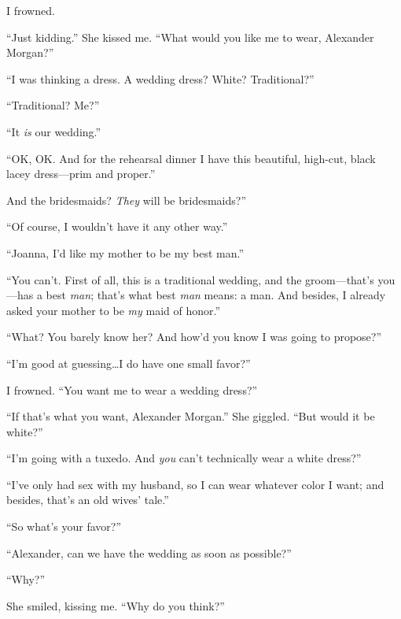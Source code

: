 I frowned.

``Just kidding.'' She kissed me. ``What would you like me to wear,
Alexander Morgan?''

``I was thinking a dress. A wedding dress? White? Traditional?''

``Traditional? Me?''

``It \emph{is} our wedding.''

``OK, OK. And for the rehearsal dinner I have this beautiful, high-cut,
black lacey dress---prim and proper.''

And the bridesmaids? \emph{They} will be bridesmaids?''

``Of course, I wouldn't have it any other way.''

``Joanna, I'd like my mother to be my best man.''

``You can't. First of all, this is a traditional wedding, and the
groom---that's you---has a best \emph{man}; that's what best \emph{man}
means: a man. And besides, I already asked your mother to be \emph{my}
maid of honor.''

``What? You barely know her? And how'd you know I was going to
propose?''

``I'm good at guessing\ldots I do have one small favor?''

I frowned. ``You want me to wear a wedding dress?''

``If that's what you want, Alexander Morgan.'' She giggled. ``But would
it be white?''

``I'm going with a tuxedo. And \emph{you} can't technically wear a white
dress?''

``I've only had sex with my husband, so I can wear whatever color I
want; and besides, that's an old wives' tale.''

``So what's your favor?''

``Alexander, can we have the wedding as soon as possible?''

``Why?''

She smiled, kissing me. ``Why do you think?''
